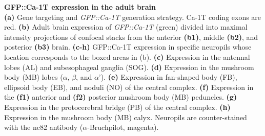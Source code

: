 \label{fig:2} 
\textbf{GFP::Ca-\alpha1T expression in the adult brain} 
\\ 
\textbf{(a)} Gene targeting and \emph{GFP::Ca-\alpha1T} generation strategy. 
Ca-\alpha1T coding exons are red.
\textbf{(b)} Adult brain expression of \emph{GFP::Ca-\alpha1T} (green) divided into maximal intensity projections of confocal stacks from the anterior \textbf{(b1)}, middle \textbf{(b2)}, and posterior \textbf{(b3)} brain.
\textbf{(c-h)} GFP::Ca-\alpha1T expression in specific neuropils whose location corresponds to the boxed areas in (b).
\textbf{(c)} Expression in the antennal lobes (AL) and subesophageal ganglia (SOG).
\textbf{(d)} Expression in the mushroom body (MB) lobes ($\alpha$, $\beta$, and $\alpha$'). 
\textbf{(e)} Expression in fan-shaped body (FB), ellipsoid body (EB), and noduli (NO) of the central complex.
\textbf{(f)} Expression in the \textbf{(f1)} anterior and \textbf{(f2)} posterior mushroom body (MB) peduncles.
\textbf{(g)} Expression in the protocerebral bridge (PB) of the central complex. 
\textbf{(h)} Expression in the mushroom body (MB) calyx. 
Neuropils are counter-stained with the nc82 antibody ($\alpha$-Bruchpilot, magenta).
